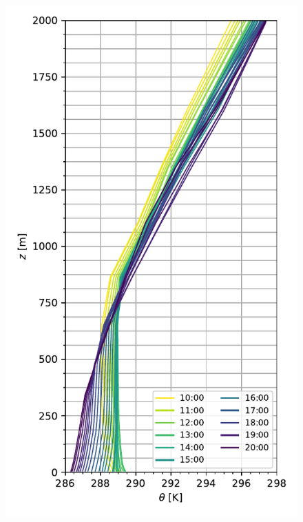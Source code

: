 \begin{figure}[H]
	\begin{minipage}{0.5\linewidth}
	\end{minipage}%
	\begin{minipage}{0.5\linewidth}
	\end{minipage}%
	
	\begin{minipage}{0.5\linewidth}
		\centering
		\includegraphics[width=0.9\linewidth,trim={0cm 5mm 0cm 0mm},clip]{Imagenes/06/hov/pbl}%
	\end{minipage}%

\end{figure}
